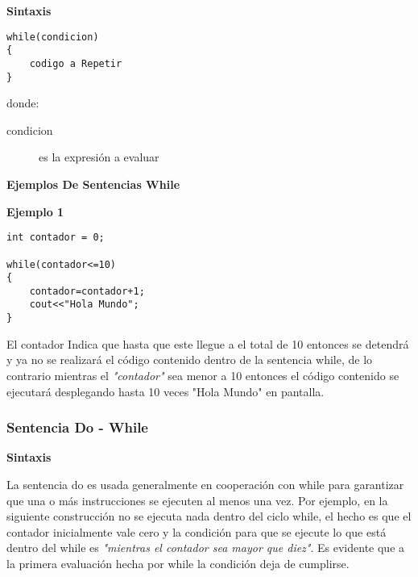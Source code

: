 \begin{center}
	\textbf{Sintaxis}
\end{center}

\begin{lstlisting}[style=Cpp, label=sintaxis-while, caption=Sintaxis While]
while(condicion)
{
    codigo a Repetir
}
\end{lstlisting}

donde:

\begin{description}
\item [condicion] es la expresión a evaluar
\end{description}

\begin{center}
	\textbf{Ejemplos De Sentencias While}
\end{center}

\textbf{Ejemplo 1}

\begin{lstlisting}[style=Cpp, label=while-ejemplo-1, caption=While Ejemplo 1]
int contador = 0;
 
while(contador<=10)
{
    contador=contador+1;
    cout<<"Hola Mundo";
}
\end{lstlisting}

El contador Indica que hasta que este llegue a el total de 10 entonces se detendrá y ya no se realizará el código contenido dentro de la sentencia while, de lo contrario mientras el \textit{"contador"} sea menor a 10 entonces el código contenido se ejecutará desplegando hasta 10 veces "Hola Mundo" en pantalla.


\subsubsection{Sentencia Do - While}

\begin{center}
	\textbf{Sintaxis}
\end{center}

La sentencia do es usada generalmente en cooperación con while para garantizar que una o más instrucciones se ejecuten al menos una vez. Por ejemplo, en la siguiente construcción no se ejecuta nada dentro del ciclo while, el hecho es que el contador inicialmente vale cero y la condición para que se ejecute lo que está dentro del while es \textit{"mientras el contador sea mayor que diez"}. Es evidente que a la primera evaluación hecha por while la condición deja de cumplirse.

